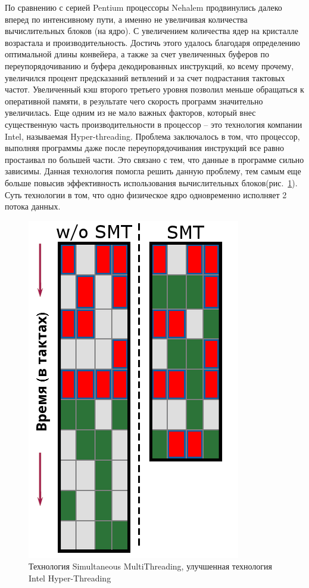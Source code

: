 \documentclass[12pt, a4paper, utf8]{article}
\begin{document}
По сравнению с серией Pentium процессоры Nehalem продвинулись далеко вперед по интенсивному пути, а именно не увеличивая количества вычислительных блоков (на ядро). С увеличением количества ядер на кристалле возрастала и производительность. Достичь этого удалось благодаря определению оптимальной длины конвейера, а также за счет увеличенных буферов по переупорядочиванию и буфера декодированных инструкций, ко всему прочему, увеличился процент предсказаний ветвлений и за счет подрастания тактовых частот. Увеличенный кэш второго третьего уровня позволил меньше обращаться к оперативной памяти, в результате чего скорость программ значительно увеличилась. Еще одним из не мало важных факторов, который внес существенную часть производительности в процессор -- это технология компании Intel, называемая Hyper-threading. Проблема заключалось в том, что процессор, выполняя программы даже после переупорядочивания инструкций все равно простаивал по большей части. Это связано с тем, что данные в программе сильно зависимы. Данная технология помогла решить данную проблему, тем самым еще больше повысив эффективность использования вычислительных блоков(рис.~\ref{fig:smt}). Суть технологии в том, что одно физическое ядро одновременно исполняет 2 потока данных.

\begin{figure}
\centering
\includegraphics[scale=0.65]{imgs/smt.png}
\caption[Технология Simultaneous MultiThreading]{Технология Simultaneous MultiThreading, улучшенная технология Intel Hyper-Threading}\label{fig:smt}
\end{figure}
\end{document}
